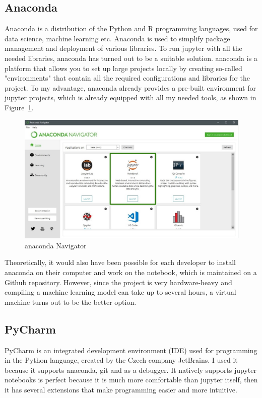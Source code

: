 \subsection{Anaconda}
Anaconda \cite{anaconda_inc_anaconda_nodate} is a distribution of the Python and R programming languages, used for data science, machine learning etc.
Anaconda is used to simplify package management and deployment of various libraries.
To run \gls{jupyter} with all the needed libraries, \gls{anaconda} has turned out to be a suitable solution. \gls{anaconda} is a platform that allows you to set up large projects locally by creating so-called "environments" that contain all the required configurations and libraries for the project. To my advantage, \gls{anaconda} already provides a pre-built environment for \gls{jupyter} projects, which is already equipped with all my needed tools, as shown in Figure~\ref{fig:fig_01}.

\begin{figure}[ht!]
\centering
\includegraphics[width=1\textwidth]{images/anaconda.jpg}
\caption{\gls{anaconda} Navigator}
\label{fig:fig_01}
\end{figure}
\FloatBarrier

Theoretically, it would also have been possible for each developer to install \gls{anaconda} on their computer and work on the notebook, which is maintained on a Github repository. However, since the project is very hardware-heavy and compiling a machine learning model can take up to several hours, a \gls{virtual machine} turns out to be the better option.

\subsection{PyCharm}
PyCharm \cite{jetbrains_sro_pycharm_nodate} is an integrated development environment (IDE) used for programming in the Python language, created by the Czech company JetBrains. I used it because it supports anaconda, git and as a debugger.
It natively supports jupyter notebooks is perfect because it is much more comfortable than jupyter itself, then it has several extensions that make programming easier and more intuitive.

